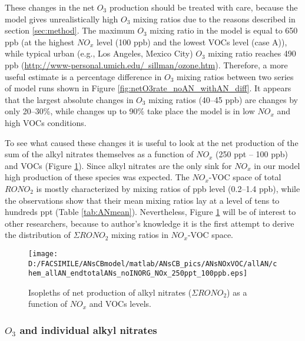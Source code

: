 \documentclass[11pt,a4paper]{article}
\begin{document}
These changes in the net $O_3$ production should be treated with care, because the model gives unrealistically high $O_3$ mixing ratios due to the reasons described in section \ref{sec:method}. The maximum $O_3$ mixing ratio in the model is equal to 650 ppb (at the highest $NO_x$ level (100 ppb) and the lowest VOCs level (case A)), while typical urban (e.g., Los Angeles, Mexico City) $O_3$ mixing ratio reaches 490 ppb (\href{http://www-personal.umich.edu/~sillman/ozone.htm}{http://www-personal.umich.edu/~sillman/ozone.htm}). Therefore, a more useful estimate is a percentage difference in $O_3$ mixing ratios between two series of model runs shown in Figure \ref{fig:netO3rate_noAN_withAN_diff}. It appears that the largest absolute changes in $O_3$ mixing ratios (40--45 ppb) are changes by only 20--30\%, while changes up to 90\% take place the model is in low $NO_x$ and high VOCs conditions.

To see what caused these changes it is useful to look at the net production of the sum of the alkyl nitrates themselves as a function of $NO_x$ (250 ppt -- 100 ppb) and VOCs (Figure \ref{fig:endtotalANs}). Since alkyl nitrates are the only sink for $NO_x$ in our model high production of these species was expected. The $NO_x$-VOC space of total $RONO_2$ is mostly characterized by mixing ratios of ppb level (0.2--1.4 ppb), while the observations show that their mean mixing ratios lay at a level of tens to hundreds ppt (Table \ref{tab:ANmean}). Nevertheless, Figure \ref{fig:endtotalANs} will be of interest to other researchers, because to author's knowledge it is the first attempt to derive the distribution of $\Sigma RONO_2$ mixing ratios in $NO_x$-VOC space.

\begin{figure} %
\centering
\texttt{[image: D:/FACSIMILE/ANsCBmodel/matlab/ANsCB\_pics/ANsNOxVOC/allAN/chem\_allAN\_endtotalANs\_noINORG\_NOx\_250ppt\_100ppb.eps]}
\caption{Isopleths of net production of alkyl nitrates ($\Sigma RONO_2$) as a function of $NO_x$ and VOCs levels.}\label{fig:endtotalANs}
\end{figure}

\subsubsection{$O_3$ and individual alkyl nitrates}
\end{document}
